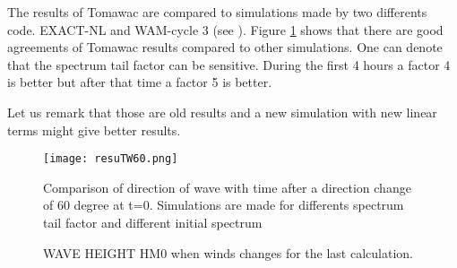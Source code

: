 The results of Tomawac are compared to simulations made by two differents code. EXACT-NL and WAM-cycle 3 (see \cite{Vanvledder1990}). Figure  \ref{resturnwind} shows that there are good agreements of Tomawac results compared to other simulations. One can denote that the spectrum tail factor can be sensitive. During the first 4 hours a factor 4 is better but after that time a factor 5 is better.

Let us remark that those are old results and a new simulation with new linear terms might give better results.

\begin{figure} [!h]
\centering
\texttt{[image: resuTW60.png]}
 \caption{Comparison of direction of wave with time after a direction change of 60 degree at t=0. Simulations are made for differents spectrum tail factor and different initial spectrum}
\label{resturnwind}
\end{figure}

\begin{figure} [!h]
\centering
{}
 \caption{WAVE HEIGHT HM0 when winds changes for the last calculation.}
\label{resturningwind}
\end{figure}
